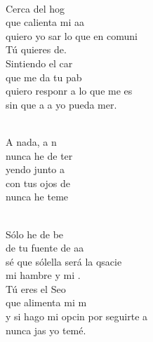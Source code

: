 \documentclass[12pt]{article}
\begin{document}
\begin{multicols*}{2}
\begin{cancion}%
	       \chord{(}{**)}{    }\\
	Cerca del hog  \\
	que calienta mi aa \\
	quiero yo sar lo que en comuni\\
	Tú quieres de.\\
	Sintiendo el car \\
	que me da tu pab \\
	quiero responr a lo que me es\\
	sin que a a yo pueda mer.\\\jump\\
	\begin{chorus}%
	A nada, a n  \\
	nunca he de ter\\
	yendo junto a \\
	con tus ojos de \\
	nunca he  teme\\
	\end{chorus}%
	\jump\\
	Sólo he de be \\
	de tu fuente de aa \\
	sé que sólella será la qsacie\\
	mi hambre y mi .\\
	Tú eres el Seo \\
	que alimenta mi m \\
	y si hago mi opcin por seguirte a\\
	nunca jas yo temé.\\\jump\\

\end{cancion}
\end{multicols*}
\end{document}
